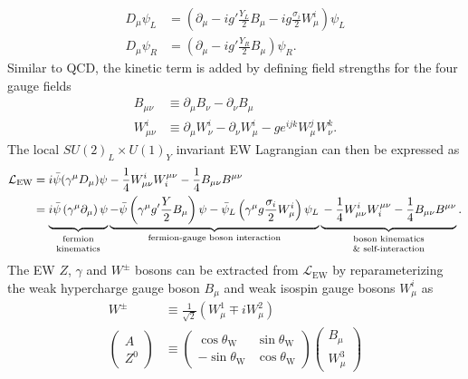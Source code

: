 \documentclass[../thesis.tex]{subfiles}
\begin{document}
\begin{equation}
\begin{aligned}
\label{eq:EW_cov}
D_\mu \psi_L &= \left( \partial_\mu - ig'\frac{Y_L}{2}B_\mu - ig\frac{\sigma_i}{2}W_\mu^i \right) \psi_L \\
D_\mu \psi_R &= \left( \partial_\mu - ig'\frac{Y_R}{2}B_\mu \right) \psi_R.
\end{aligned}
\end{equation}
Similar to \acs{QCD}, the kinetic term is added by defining field strengths for the four gauge fields
\begin{equation}
\begin{aligned}
B_{\mu \nu}   &\equiv \partial_\mu B_\nu - \partial_\nu B_\mu \\
W_{\mu \nu}^i &\equiv \partial_\mu W^i_\nu - \partial_\nu W^i_\mu - g e^{ijk} W^j_\mu W^k_\nu.
\end{aligned}
\end{equation}
The local $SU(2)_L \times U(1)_Y$ invariant \acs{EW} Lagrangian can then be expressed as
\begin{equation}
\begin{aligned}
\mathcal{L}_\text{EW} &= i\bar{\psi}(\gamma^\mu D_\mu)\psi - \frac{1}{4}W^i_{\mu\nu}W_i^{\mu\nu} - \frac{1}{4}B_{\mu\nu}B^{\mu\nu} \\
&= \underbrace{\vphantom{\left(\frac{Y}{2}\right)}
i\bar{\psi}\left(\gamma^\mu\partial_\mu\right)\psi
}_{\substack{\text{fermion}\vphantom{\frac{1}{4}}\\ \text{kinematics}}}
\underbrace{
-\bar{\psi}\left(\gamma^\mu g'\frac{Y}{2}B_\mu\right)\psi - \bar{\psi}_L\left(\gamma^\mu g\frac{\sigma_i}{2}W_\mu^i\right)\psi_L
}_\text{fermion-gauge boson interaction}
\underbrace{\vphantom{\left(\frac{Y}{2}\right)}
-\frac{1}{4}W^i_{\mu\nu}W_i^{\mu\nu} - \frac{1}{4}B_{\mu\nu}B^{\mu\nu}
}_{\substack{\text{boson kinematics}\vphantom{\frac{1}{4}}\\ \text{\& self-interaction}}}.
\end{aligned}
\end{equation}
The \acs{EW} $Z$, $\gamma$ and $W^\pm$ bosons can be extracted from $\mathcal{L}_\text{EW}$ by reparameterizing the weak hypercharge gauge boson $B_\mu$ and weak isospin gauge bosons $W_\mu^i$ as
\begin{equation}
\begin{aligned}
\label{eq:EW_repara}
W^\pm &\equiv \frac{1}{\sqrt{2}}\left(W^1_\mu \mp iW^2_\mu\right) \\ 
\begin{pmatrix}
A \\ Z^0
\end{pmatrix}
&\equiv \begin{pmatrix}
\cos \theta_\text{W} & \sin \theta_\text{W} \\
-\sin \theta_\text{W} & \cos \theta_\text{W}
\end{pmatrix}
\begin{pmatrix}
B_\mu \\ W_\mu^3
\end{pmatrix}
\end{aligned}
\end{equation}
\end{document}

